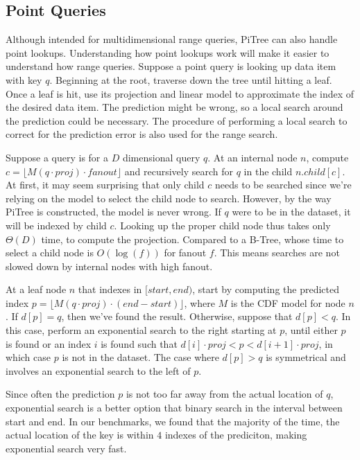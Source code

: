 \documentclass[sigconf,10pt]{acmart}
\begin{document}
\subsection{Point Queries}

Although intended for multidimensional range queries,
PiTree can also handle point lookups. Understanding how point lookups
work will make it easier to understand how range queries.
Suppose a point query is looking up data item with key $q$.
Beginning at the root, traverse down the tree until hitting a leaf.
Once a leaf is hit, use its projection and linear model to approximate
the index of the desired data item. The prediction might be wrong,
so a local search around the prediction could be necessary.
The procedure of performing a local search to correct for the prediction error
is also used for the range search.

Suppose a query is for a $D$ dimensional query $q$.
At an internal node $n$, compute $c = \lfloor M(q \cdot proj) \cdot fanout \rfloor$
and recursively search for $q$ in the child $n.child[c]$.
At first, it may seem surprising that only child $c$ needs to be searched
since we're relying on the model to select the child node to search.
However, by the way PiTree is constructed, the model is never wrong.
If $q$ were to be in the dataset,
it will be indexed by child $c$. Looking up the proper child node thus takes only
$\Theta(D)$ time, to compute the projection. Compared to a B-Tree, whose
time to select a child node is $O(\log(f))$ for fanout $f$. This means
searches are not slowed down by internal nodes with high fanout.

At a leaf node $n$ that indexes in $[start, end)$, start by computing the predicted
index
$p = \lfloor M(q \cdot proj) \cdot (end - start) \rfloor$, where $M$ is the CDF model for node $n$.
If $d[p] = q$, then we've found the result.
Otherwise, suppose that $d[p] < q$.
In this case, perform an exponential search to the right starting at $p$,
until either $p$ is found or an index $i$ is found such that 
$d[i] \cdot proj < p < d[i+1] \cdot proj$, in which case $p$ is not in the dataset.
The case where $d[p] > q$ is symmetrical and involves an exponential search
to the left of $p$.

Since often the prediction $p$ is not too far away from the actual location
of $q$, exponential search is a better option that binary search in the interval
between start and end. In our benchmarks, we found that the majority of the time,
the actual location of the key is within $4$ indexes of the prediciton,
making exponential search very fast. 
\end{document}
